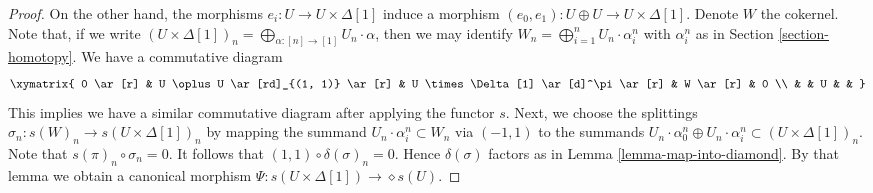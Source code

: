 \begin{proof}
\medskip\noindent
On the other hand, the morphisms $e_i : U \to U \times \Delta[1]$ induce
a morphism $(e_0, e_1) : U \oplus U \to U \times \Delta[1]$.
Denote $W$ the cokernel. Note that, if we write
$(U \times \Delta[1])_n = \bigoplus_{\alpha : [n] \to [1]} U_n \cdot \alpha$,
then we may identify
$W_n = \bigoplus_{i = 1}^n U_n \cdot \alpha^n_i$ with
$\alpha^n_i$ as in Section \ref{section-homotopy}.
We have a commutative diagram
$$
\xymatrix{
0 \ar[r] &
U \oplus U \ar[rd]_{(1, 1)} \ar[r] &
U \times \Delta[1] \ar[d]^\pi \ar[r] &
W \ar[r] &
0 \\
& & U & &
}
$$
This implies we have a similar commutative diagram after
applying the functor $s$. Next, we choose the splittings
$\sigma_n : s(W)_n \to s(U \times \Delta[1])_n$ by mapping
the summand $U_n \cdot \alpha^n_i \subset W_n$ via $(-1, 1)$
to the summands $U_n \cdot \alpha^n_0 \oplus U_n \cdot \alpha^n_i
\subset (U \times \Delta[1])_n$. Note that $s(\pi)_n \circ \sigma_n = 0$.
It follows that $(1, 1) \circ \delta(\sigma)_n = 0$.
Hence $\delta(\sigma)$ factors as in
Lemma \ref{lemma-map-into-diamond}. By that lemma
we obtain a canonical morphism
$\Psi : s(U \times \Delta[1]) \to \diamond{s(U)}$.


\end{proof}

